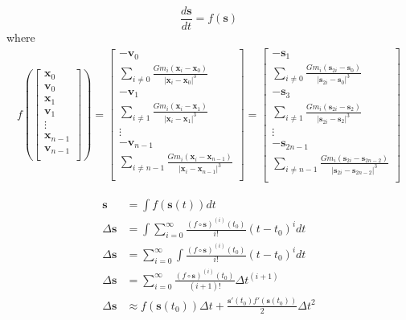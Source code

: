 \documentclass[12pt,letterpaper]{article}
\newcommand{\vex}{\bm{x}}
\newcommand{\vev}{\bm{v}}
\newcommand{\ves}{\bm{s}}
\begin{document}
    \[
    \frac{d\ves}{dt}=f(\ves)
    \]
    where
    \begin{align*}
        f(\left[\begin{matrix}
            \vex_0\\\vev_0\\
            \vex_1\\\vev_1\\
            \vdots\\
            \vex_{n-1}\\\vev_{n-1}\\
        \end{matrix}\right])
        =
        \left[\begin{matrix}
            -\vev_0\\\sum_{i\neq 0}\frac{Gm_i(\vex_i-\vex_0)}{|\vex_i-\vex_0|^3}\\
            -\vev_1\\\sum_{i\neq 1}\frac{Gm_i(\vex_i-\vex_1)}{|\vex_i-\vex_1|^3}\\
            \vdots\\
            -\vev_{n-1}\\\sum_{i\neq n-1}\frac{Gm_i(\vex_i-\vex_{n-1})}{|\vex_i-\vex_{n-1}|^3}\\
        \end{matrix}\right]
        =
        \left[\begin{matrix}
            -\ves_1\\\sum_{i\neq 0}\frac{Gm_i(\ves_{2i}-\ves_0)}{|\ves_{2i}-\ves_0|^3}\\
            -\ves_3\\\sum_{i\neq 1}\frac{Gm_i(\ves_{2i}-\ves_2)}{|\ves_{2i}-\ves_2|^3}\\
            \vdots\\
            -\ves_{2n-1}\\\sum_{i\neq {n-1}}\frac{Gm_i(\ves_{2i}-\ves_{2n-2})}{|\ves_{2i}-\ves_{2n-2}|^3}\\
        \end{matrix}\right]
    \end{align*}

    \begin{align*}
        \ves&=\int f(\ves(t))dt\\
        \Delta\ves&=\int \sum_{i=0}^{\infty}\frac{(f\circ\ves)^{(i)}(t_0)}{i!}(t-t_0)^idt\\
        \Delta\ves&=\sum_{i=0}^{\infty}\int\frac{(f\circ\ves)^{(i)}(t_0)}{i!}(t-t_0)^idt\\
        \Delta\ves&=\sum_{i=0}^{\infty}\frac{(f\circ\ves)^{(i)}(t_0)}{(i+1)!}\Delta t^{(i+1)}\\
        \Delta\ves&\approx f(\ves(t_0))\Delta t+\frac{\ves'(t_0)f'(\ves(t_0))}{2}\Delta t^2\\
    \end{align*}
\end{document}
